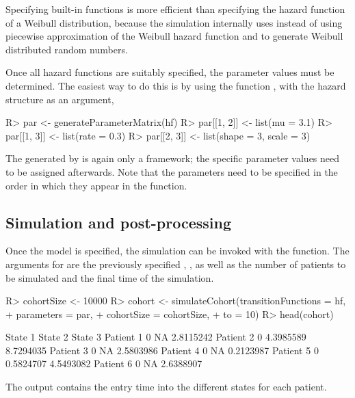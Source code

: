 Specifying built-in functions is more efficient than specifying the hazard function of a Weibull distribution, because the simulation internally uses  instead of using piecewise approximation of the Weibull hazard function and  to generate Weibull distributed random numbers. 

Once all hazard functions are suitably specified, the parameter values must be determined. The easiest way to do this is by using the function , with the hazard structure  as an argument,
\begin{Schunk}
\begin{Sinput}
R>   par <- generateParameterMatrix(hf)
R>   par[[1, 2]] <- list(mu = 3.1)
R>   par[[1, 3]] <- list(rate = 0.3)
R>   par[[2, 3]] <- list(shape = 3, scale = 3)
\end{Sinput}
\end{Schunk}
The  generated by  is again only a framework; the specific parameter values need to be assigned afterwards. Note that the parameters need to be specified in the order in which they appear in the function. 

\subsection[Simulation]{Simulation and post-processing}\label{usesim}

Once the model is specified, the simulation can be invoked with the  function. The arguments for  are the previously specified , , as well as the number of patients  to be simulated and the final time  of the simulation.
\begin{Schunk}
\begin{Sinput}
R>   cohortSize <- 10000
R>   cohort <- simulateCohort(transitionFunctions = hf, 
+                            parameters = par, 
+                            cohortSize = cohortSize, 
+                            to = 10)
R>   head(cohort)
\end{Sinput}
\begin{Soutput}
          State 1   State 2   State 3
Patient 1       0        NA 2.8115242
Patient 2       0 4.3985589 8.7294035
Patient 3       0        NA 2.5803986
Patient 4       0        NA 0.2123987
Patient 5       0 0.5824707 4.5493082
Patient 6       0        NA 2.6388907
\end{Soutput}
\end{Schunk}
The output  contains the entry time into the different states for each patient. 

